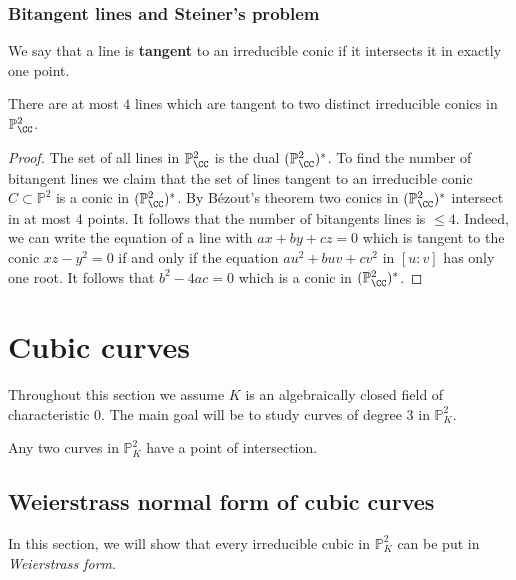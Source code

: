 \documentclass[12pt, a4paper]{article}
\newcommand{\PP}{\mathbb P}
\begin{document}
\subsubsection{Bitangent lines and Steiner's problem}

\begin{definition}
    We say that a line is \textbf{tangent} to an irreducible conic if it intersects it in exactly one point.
\end{definition}

\begin{mdthm}
    There are at most \(4\) lines which are tangent to two distinct irreducible conics in \(\PP^2_{\CC}\).
\end{mdthm}

\begin{proof}
    The set of all lines in \(\PP^2_{\CC}\) is the dual \((\PP^2_{\CC})^*\). To find the number of bitangent lines we claim that the set of lines tangent to an irreducible conic \(C \subset \PP^2\) is a conic in \((\PP^2_{\CC})^*\). By Bézout's theorem two conics in \((\PP^2_{\CC})^*\) intersect in at most \(4\) points. It follows that the number of bitangents lines is \(\leq 4\). Indeed, we can write the equation of a line with \(ax+by+cz=0\) which is tangent to the conic \(xz-y^2=0\) if and only if the equation \(au^2+buv+cv^2\) in \([u:v]\) has only one root. It follows that \(b^2-4ac=0\) which is a conic in \((\PP^2_{\CC})^*\).
\end{proof}

\section{Cubic curves}

\begin{mdnote}
    Throughout this section we assume \(K\) is an algebraically closed field of characteristic \(0\). The main goal will be to study curves of degree \(3\) in \(\PP^2_K\).
\end{mdnote}

\begin{mdthm}
    Any two curves in \(\PP^2_K\) have a point of intersection.
\end{mdthm}

\subsection{Weierstrass normal form of cubic curves}

\begin{mdnote}
    In this section, we will show that every irreducible cubic in \(\PP^2_K\) can be put in \textit{Weierstrass form}.
\end{mdnote}
\end{document}
